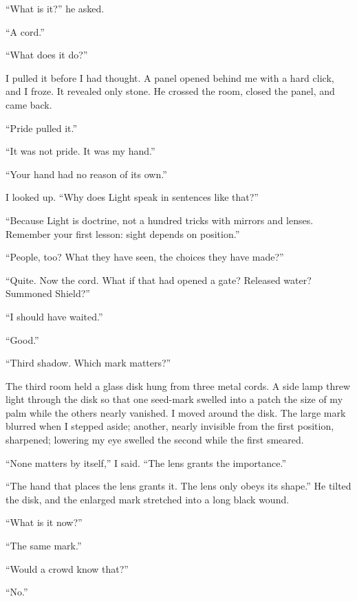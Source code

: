 ``What is it?'' he asked.\par
``A cord.''\par
``What does it do?''\par

I pulled it before I had thought. A panel opened behind me with a hard click, and I froze. It revealed only stone. He crossed the room, closed the panel, and came back.\par

``Pride pulled it.''\par
``It was not pride. It was my hand.''\par
``Your hand had no reason of its own.''\par
I looked up. ``Why does Light speak in sentences like that?''\par
``Because Light is doctrine, not a hundred tricks with mirrors and lenses. Remember your first lesson: sight depends on position.''\par
``People, too? What they have seen, the choices they have made?''\par
``Quite. Now the cord. What if that had opened a gate? Released water? Summoned Shield?''\par
``I should have waited.''\par
``Good.''\par

\ornament

``Third shadow. Which mark matters?'' \par

The third room held a glass disk hung from three metal cords. A side lamp threw light through the disk so that one seed-mark swelled into a patch the size of my palm while the others nearly vanished. I moved around the disk. The large mark blurred when I stepped aside; another, nearly invisible from the first position, sharpened; lowering my eye swelled the second while the first smeared.\par

``None matters by itself,'' I said. ``The lens grants the importance.''\par
``The hand that places the lens grants it. The lens only obeys its shape.'' He tilted the disk, and the enlarged mark stretched into a long black wound. \par
``What is it now?''\par
``The same mark.''\par
``Would a crowd know that?''\par
``No.''\par

